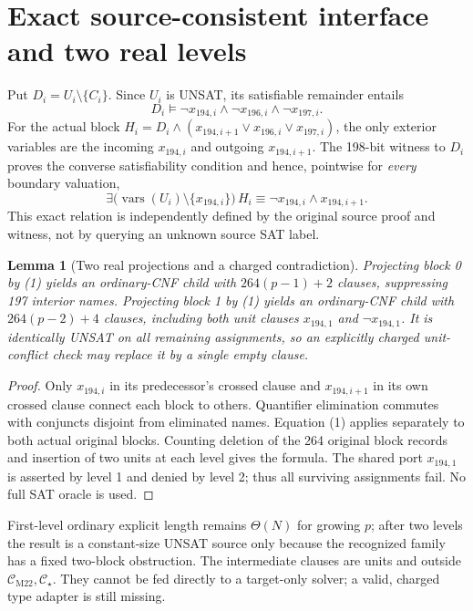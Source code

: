 \documentclass[11pt]{article}
\newtheorem{lemma}[theorem]{Lemma}
\newcommand{\CM}{\mathcal C_{\mathrm{M22}}}
\newcommand{\CS}{\mathcal C_\star}
\begin{document}
\section{Exact source-consistent interface and two real levels}
Put \(D_i=U_i\setminus\{C_i\}\). Since \(U_i\) is UNSAT, its satisfiable remainder entails
\[
D_i\models\neg x_{194,i}\land\neg x_{196,i}\land\neg x_{197,i}.
\]
For the actual block \(H_i=D_i\land(x_{194,i+1}\lor x_{196,i}\lor x_{197,i})\), the only exterior variables are the incoming \(x_{194,i}\) and outgoing \(x_{194,i+1}\). The 198-bit witness to \(D_i\) proves the converse satisfiability condition and hence, pointwise for \emph{every} boundary valuation,
\[
\boxed{
\exists\bigl(\operatorname{vars}(U_i)\setminus\{x_{194,i}\}\bigr)\,H_i
\equiv\neg x_{194,i}\land x_{194,i+1}.
}
\tag{1}
\]
This exact relation is independently defined by the original source proof and witness, not by querying an unknown source SAT label.

\begin{lemma}[Two real projections and a charged contradiction]
Projecting block 0 by (1) yields an ordinary-CNF child with \(264(p-1)+2\) clauses, suppressing 197 interior names. Projecting block 1 by (1) yields an ordinary-CNF child with \(264(p-2)+4\) clauses, including both unit clauses \(x_{194,1}\) and \(\neg x_{194,1}\). It is identically UNSAT on all remaining assignments, so an explicitly charged unit-conflict check may replace it by a single empty clause.
\end{lemma}
\begin{proof}
Only \(x_{194,i}\) in its predecessor's crossed clause and \(x_{194,i+1}\) in its own crossed clause connect each block to others. Quantifier elimination commutes with conjuncts disjoint from eliminated names. Equation (1) applies separately to both actual original blocks. Counting deletion of the 264 original block records and insertion of two units at each level gives the formula. The shared port \(x_{194,1}\) is asserted by level 1 and denied by level 2; thus all surviving assignments fail. No full SAT oracle is used.
\end{proof}
First-level ordinary explicit length remains \(\Theta(N)\) for growing \(p\); after two levels the result is a constant-size UNSAT source only because the recognized family has a fixed two-block obstruction. The intermediate clauses are units and outside \(\CM,\CS\). They cannot be fed directly to a target-only solver; a valid, charged type adapter is still missing.
\end{document}
